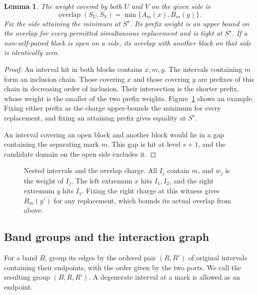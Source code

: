 \documentclass[10pt,letterpaper]{article}
\newtheorem{lemma}{Lemma}
\begin{document}
\begin{lemma}\label{lem:overlap}
The weight covered by both \(U\) and \(V\) on the given side is
\begin{equation}
     \operatorname{overlap}(S_U,S_V)=\min\{A_m(x),B_m(y)\}.
     \label{eq:overlap}
\end{equation}
Fix the side attaining the minimum at \(S^\star\). Its prefix weight is an upper bound on the overlap for every permitted simultaneous replacement and is tight at \(S^\star\). If a non-self-paired block is open on a side, its overlap with another block on that side is identically zero.
\end{lemma}
\begin{proof}
An interval hit in both blocks contains \(x,m,y\). The intervals containing \(m\) form an inclusion chain. Those covering \(x\) and those covering \(y\) are prefixes of this chain in decreasing order of inclusion. Their intersection is the shorter prefix, whose weight is the smaller of the two prefix weights. Figure~\ref{fig:overlap} shows an example. Fixing either prefix as the charge upper-bounds the minimum for every replacement, and fixing an attaining prefix gives equality at \(S^\star\).

An interval covering an open block and another block would lie in a gap containing the separating mark \(m\). This gap is hit at level \(s+1\), and the candidate domain on the open side excludes it.
\end{proof}

\begin{figure}[H]
\centering

\caption{Nested intervals and the overlap charge. All \(I_j\) contain \(m\), and \(w_j\) is the weight of \(I_j\). The left extremum \(x\) hits \(I_1,I_2\), and the right extremum \(y\) hits \(I_1\). Fixing the right charge at this witness gives \(B_m(y')\) for any replacement, which bounds its actual overlap from above.}
\label{fig:overlap}
\end{figure}

\subsection{Band groups and the interaction graph}\label{sec:bandgroups}
For a band \(B\), group its edges by the ordered pair \((R,R')\) of original intervals containing their endpoints, with the order given by the two ports. We call the resulting group \((B,R,R')\). A degenerate interval at a mark is allowed as an endpoint.
\end{document}
